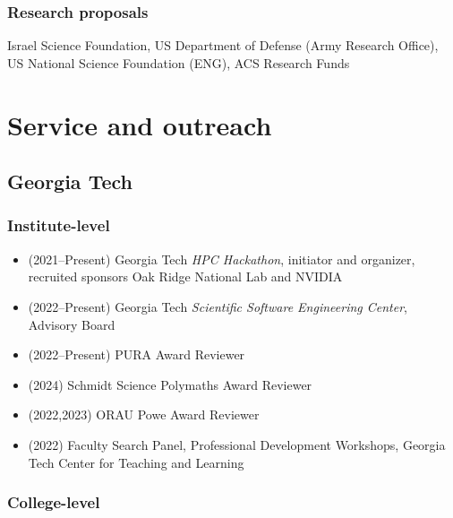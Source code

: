 \subsubsection{Research proposals}

Israel Science Foundation, US Department of Defense (Army Research Office), US National Science Foundation (ENG), ACS Research Funds

\section{Service and outreach}

\subsection{Georgia Tech}

\subsubsection{Institute-level}

\begin{itemize}
    \item (2021--Present) Georgia Tech \textit{HPC Hackathon}, initiator and organizer, recruited sponsors Oak Ridge National Lab and NVIDIA 
    \item (2022--Present) Georgia Tech \textit{Scientific Software Engineering Center}, Advisory Board
    \item (2022--Present) PURA Award Reviewer
    \item (2024) Schmidt Science Polymaths Award Reviewer
    \item (2022,2023) ORAU Powe Award Reviewer
    \item (2022) Faculty Search Panel, Professional Development Workshops, Georgia Tech Center for Teaching and Learning
\end{itemize}

\subsubsection{College-level}

